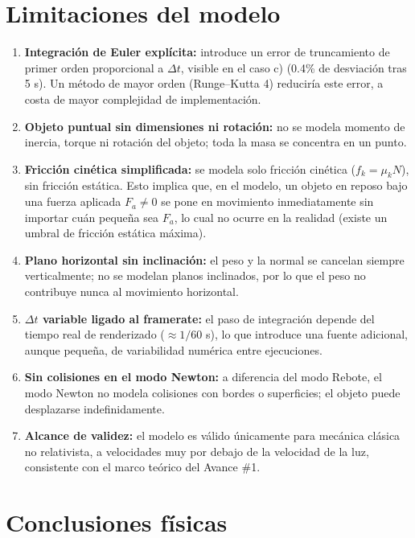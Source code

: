 \documentclass[12pt,letterpaper]{article}
\begin{document}
\section{Limitaciones del modelo}

\begin{enumerate}[leftmargin=1.5em]
  \item \textbf{Integración de Euler explícita:} introduce un error de truncamiento de primer orden proporcional a $\Delta t$, visible en el caso c) (0.4\% de desviación tras 5 s). Un método de mayor orden (Runge--Kutta 4) reduciría este error, a costa de mayor complejidad de implementación.
  \item \textbf{Objeto puntual sin dimensiones ni rotación:} no se modela momento de inercia, torque ni rotación del objeto; toda la masa se concentra en un punto.
  \item \textbf{Fricción cinética simplificada:} se modela solo fricción cinética ($f_k=\mu_k N$), sin fricción estática. Esto implica que, en el modelo, un objeto en reposo bajo una fuerza aplicada $F_a\neq 0$ se pone en movimiento inmediatamente sin importar cuán pequeña sea $F_a$, lo cual no ocurre en la realidad (existe un umbral de fricción estática máxima).
  \item \textbf{Plano horizontal sin inclinación:} el peso y la normal se cancelan siempre verticalmente; no se modelan planos inclinados, por lo que el peso no contribuye nunca al movimiento horizontal.
  \item \textbf{$\Delta t$ variable ligado al framerate:} el paso de integración depende del tiempo real de renderizado ($\approx 1/60$ s), lo que introduce una fuente adicional, aunque pequeña, de variabilidad numérica entre ejecuciones.
  \item \textbf{Sin colisiones en el modo Newton:} a diferencia del modo Rebote, el modo Newton no modela colisiones con bordes o superficies; el objeto puede desplazarse indefinidamente.
  \item \textbf{Alcance de validez:} el modelo es válido únicamente para mecánica clásica no relativista, a velocidades muy por debajo de la velocidad de la luz, consistente con el marco teórico del Avance \#1.
\end{enumerate}

\section{Conclusiones físicas}
\end{document}
